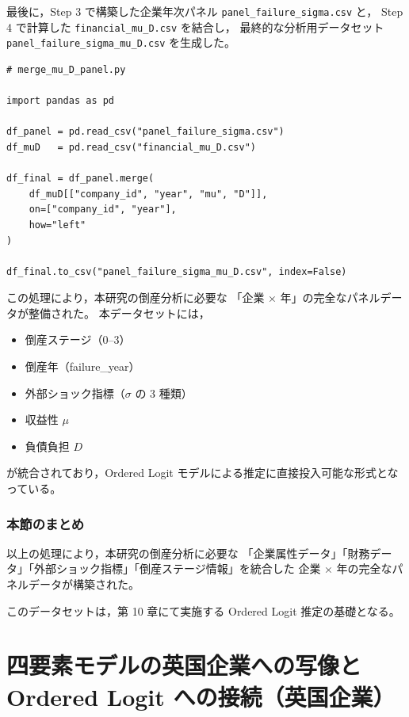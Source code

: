 最後に，Step 3 で構築した企業年次パネル
\texttt{panel\_failure\_sigma.csv} と，
Step 4 で計算した \texttt{financial\_mu\_D.csv} を結合し，
最終的な分析用データセット \texttt{panel\_failure\_sigma\_mu\_D.csv} を生成した。

\begin{verbatim}
# merge_mu_D_panel.py

import pandas as pd

df_panel = pd.read_csv("panel_failure_sigma.csv")
df_muD   = pd.read_csv("financial_mu_D.csv")

df_final = df_panel.merge(
    df_muD[["company_id", "year", "mu", "D"]],
    on=["company_id", "year"],
    how="left"
)

df_final.to_csv("panel_failure_sigma_mu_D.csv", index=False)
\end{verbatim}

この処理により，本研究の倒産分析に必要な
「企業 × 年」の完全なパネルデータが整備された。
本データセットには，

\begin{itemize}
    \item 倒産ステージ（0--3）
    \item 倒産年（failure\_year）
    \item 外部ショック指標（$\sigma$ の 3 種類）
    \item 収益性 $\mu$
    \item 負債負担 $D$
\end{itemize}

が統合されており，Ordered Logit モデルによる推定に直接投入可能な形式となっている。

\subsubsection*{本節のまとめ}

以上の処理により，本研究の倒産分析に必要な
「企業属性データ」「財務データ」「外部ショック指標」「倒産ステージ情報」を統合した
企業 × 年の完全なパネルデータが構築された。

このデータセットは，第 10 章にて実施する Ordered Logit 推定の基礎となる。


\section{四要素モデルの英国企業への写像と Ordered Logit への接続（英国企業）}

